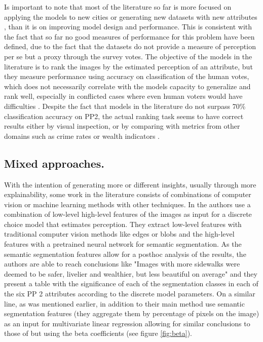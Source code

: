 Is important to note that most of the literature so far is more focused on applying the models to new cities
\cite{zhang_measuring, santani, costa_lisbon, rossetti} or generating new datasets with new attributes
\cite{santani, zhang_uncovering}, than it is on improving model  design and performance.
This is consistent with the fact that so far no good measures of performance for this problem have been defined,
due to the fact that the datasets do not provide a measure of perception per se but a proxy through the survey votes.
The objective of the models in the literature is to rank the images by the estimated perception of an attribute, but
they measure  performance using accuracy on classification of the human votes, which does not necessarily correlate with the
models capacity to generalize and rank well, especially in conflicted cases where even human voters
would have difficulties \cite{zhang_measuring}. Despite the fact that models in the literature do not surpass 70\%
classification  accuracy on  PP2, the actual ranking task seems to have correct results either by visual inspection,
or by comparing with metrics from other domains such as crime rates or wealth indicators \cite{rossetti,zhang_measuring,tamara_judgments}.


\subsection{Mixed approaches.}
\label{section:mixed}

With the intention of generating more or different insights, usually through more explainability, some
work in the literature consists of combinations of computer vision or machine learning methods
with other techniques. In  the authors use a combination of low-level high-level features
of the images as input for a discrete choice model that estimates perception. They extract low-level features
with traditional computer vision methods like edges or blobs and the high-level features with a pretrained
neural network for semantic segmentation. As the semantic segmentation features allow for a posthoc analysis of
the results, the authors are able to reach conclusions like "Images with more sidewalks were deemed to be
safer, livelier and wealthier, but less beautiful on average" and they present a table with the significance
of each of the segmentation classes in each of the six PP 2 attributes according to the discrete model parameters.
On a similar line, as was mentioned earlier,  in addition to their main method use
semantic segmentation features (they aggregate them by percentage of pixels on the image)
as an input for multivariate linear regression allowing for similar conclusions to those of 
but using the beta coefficients (see figure \ref{fig:beta}).

